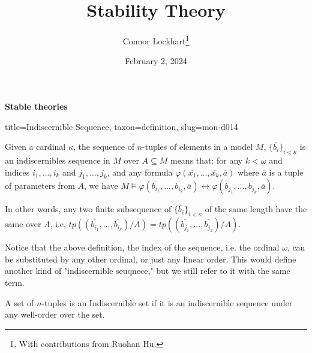 \documentclass[a4paper]{article}
\title{Stability Theory}
\date{February 2, 2024}
\author{Connor Lockhart\thanks{With contributions from Ruohan Hu.}}
\begin{document}
\maketitle
\par{\textbf{Stable theories}}
\begin{tree}{title={Indiscernible Sequence}, taxon={definition}, slug={mon-d014}}


Given a cardinal \(\kappa\), the sequence of \(n\)-tuples of elements in a model \(M\), \(\{ \overline {b_i} \} _{i< \kappa }\) is an indiscernibles sequence in \(M\) over \(A \subseteq  M\) means that: for any \(k< \omega\) and indices \(i_1,...,i_k\) and \(j_1,...,j_k\), and any formula \(\varphi ( \overline {x_1},..., \overline {x_k}, \overline {a})\) where \(\overline {a}\) is a tuple of parameters from \(A\), we have \(M \models   \varphi ( \overline {b_{i_1}},..., \overline {b_{i_k}}, \overline {a}) \leftrightarrow   \varphi ( \overline {b_{j_1}},..., \overline {b_{j_k}}, \overline {a})\).

In other words, any two finite subsequence of \(\{ \overline {b_i} \} _{i< \kappa }\) of the same length have the same  over \(A\), i.e, \(tp(( \overline {b_{i_1}},..., \overline {b_{i_k}})/A)=tp(( \overline {b_{j_1}},..., \overline {b_{j_k}})/A)\). 

Notice that the above definition, the index of the sequence, i.e. the ordinal \(\omega\), can be substituted by any other ordinal, or just any linear order. This would define another kind of "indiscernible seuqnece," but we still refer to it with the same term.

A set of \(n\)-tuples is an Indiscernible set if it is an indiscernible sequence under any well-order over the set.

\end{tree}
\end{document}
